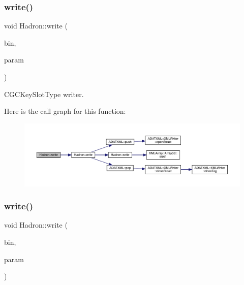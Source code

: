 \subsubsection{\texorpdfstring{write()}{write()}\hspace{0.1cm}{\footnotesize\ttfamily [1/95]}}
{\footnotesize\ttfamily void Hadron\+::write (\begin{DoxyParamCaption}\item[{\mbox{\hyperlink{classADATIO_1_1BinaryWriter}{Binary\+Writer}} \&}]{bin,  }\item[{const \mbox{\hyperlink{structHadron_1_1KeyCGCSU2__t}{Key\+C\+G\+C\+S\+U2\+\_\+t}} \&}]{param }\end{DoxyParamCaption})}



C\+G\+C\+Key\+Slot\+Type writer. 

Here is the call graph for this function\+:
\nopagebreak
\begin{figure}[H]
\begin{center}
\leavevmode
\includegraphics[width=350pt]{d1/daf/namespaceHadron_aeadf04c31606521c48ee674d28e2ca3e_cgraph}
\end{center}
\end{figure}
\mbox{\label{namespaceHadron_a4073084eccc97c67b860f51e4efd91e0}} 
\subsubsection{\texorpdfstring{write()}{write()}\hspace{0.1cm}{\footnotesize\ttfamily [2/95]}}
{\footnotesize\ttfamily void Hadron\+::write (\begin{DoxyParamCaption}\item[{\mbox{\hyperlink{classADATIO_1_1BinaryWriter}{Binary\+Writer}} \&}]{bin,  }\item[{const \mbox{\hyperlink{structHadron_1_1KeyCGCPermS3__t}{Key\+C\+G\+C\+Perm\+S3\+\_\+t}} \&}]{param }\end{DoxyParamCaption})}



